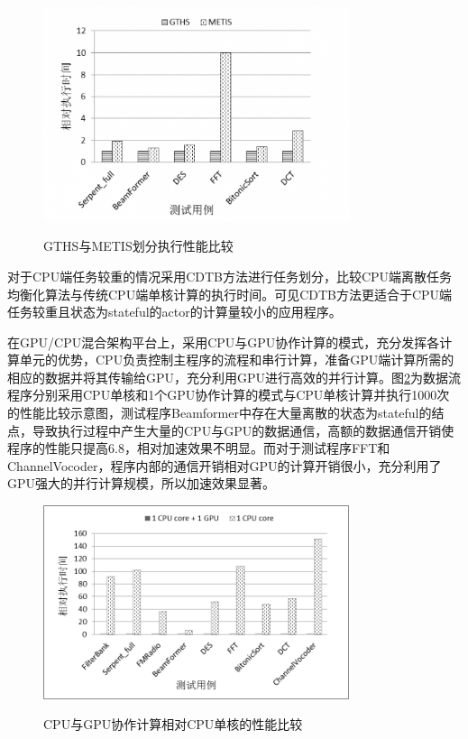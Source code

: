 \begin{figure}[htbp]
  \centering
  \includegraphics[width=0.8\textwidth]{Img/Chap_Application/Yu/gths-metis.png}\\
  \caption{GTHS与METIS划分执行性能比较}\label{fig:gths-metis}
\end{figure}

对于CPU端任务较重的情况采用CDTB方法进行任务划分，比较CPU端离散任务均衡化算法与传统CPU端单核计算的执行时间。可见CDTB方法更适合于CPU端任务较重且状态为stateful的actor的计算量较小的应用程序。

在GPU/CPU混合架构平台上，采用CPU与GPU协作计算的模式，充分发挥各计算单元的优势，CPU负责控制主程序的流程和串行计算，准备GPU端计算所需的相应的数据并将其传输给GPU，充分利用GPU进行高效的并行计算。图\ref{fig:5.4}为数据流程序分别采用CPU单核和1个GPU协作计算的模式与CPU单核计算并执行1000次的性能比较示意图，测试程序Beamformer中存在大量离散的状态为stateful的结点，导致执行过程中产生大量的CPU与GPU的数据通信，高额的数据通信开销使程序的性能只提高6.8，相对加速效果不明显。而对于测试程序FFT和ChannelVocoder，程序内部的通信开销相对GPU的计算开销很小，充分利用了GPU强大的并行计算规模，所以加速效果显著。

\begin{figure}[htbp]
  \centering
  \includegraphics[width=0.8\textwidth]{Img/Chap_Application/Yu/5-4.png}\\
  \caption{CPU与GPU协作计算相对CPU单核的性能比较}\label{fig:5.4}
\end{figure}


